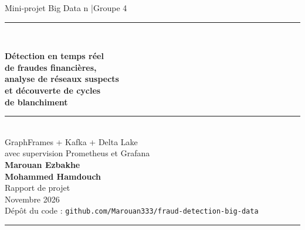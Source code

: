 \documentclass[11pt,a4paper]{article}
\begin{document}
\begin{titlepage}
\thispagestyle{empty}
\centering
\vspace*{1.2cm}
{\large Mini-projet Big Data n \quad|\quad Groupe 4}\\[2.2cm]
{\color{navy}\rule{\textwidth}{1.2pt}}\\[0.6cm]
{\Huge\bfseries\color{navy} D\'etection en temps r\'eel\\ de fraudes financi\`eres,\\[4pt] analyse de r\'eseaux suspects\\[4pt] et d\'ecouverte de cycles\\ de blanchiment\par}
\vspace{0.6cm}
{\color{navy}\rule{\textwidth}{1.2pt}}\\[1.0cm]
{\Large GraphFrames \;+\; Kafka \;+\; Delta Lake}\\[0.3cm]
{\large avec supervision Prometheus et Grafana}\\[3.2cm]
{\Large\bfseries Marouan Ezbakhe}\\[0.2cm]
{\Large\bfseries Mohammed Hamdouch}\\[2.6cm]
{\large Rapport de projet}\\[0.2cm]
{\large Novembre 2026}\\[1.6cm]
{\small D\'ep\^ot du code : \texttt{github.com/Marouan333/fraud-detection-big-data}}
\end{titlepage}

\newpage
\begin{abstract}
\noindent Ce rapport pr\'esente un pipeline Big Data qui r\'epond \`a deux probl\`emes de criminalit\'e financi\`ere : d\'etecter la fraude au moment o\`u elle se produit, et r\'ev\'eler des circuits de blanchiment cach\'es dans un r\'eseau de comptes. La premi\`ere partie rejoue 6\,362\,620 transactions PaySim dans \textbf{Kafka}, les traite avec \textbf{Spark Structured Streaming} et les stocke dans \textbf{Delta Lake} avec une garantie d'\'ecriture sans doublon. La seconde partie construit un graphe de 515\,088 comptes et 5\,078\,345 transactions (IBM AML) et applique \textbf{GraphFrames} : PageRank pour rep\'erer les comptes pivots, Label Propagation pour les communaut\'es et composantes fortement connexes pour les cycles. L'ensemble est supervis\'e en direct avec \textbf{Prometheus} et \textbf{Grafana}. Les r\'esultats sont mesur\'es : un compte du top~1\,\% de PageRank a 4,2 fois plus de chances d'\^etre impliqu\'e dans du blanchiment qu'un compte pris au hasard, et 50 cycles couvrant 289 comptes sont identifi\'es.
\end{abstract}
\vspace{0.4cm}
{\color{navy}\rule{\textwidth}{0.6pt}}
\setcounter{tocdepth}{1}
\tableofcontents
\vspace{0.3cm}
\end{document}
